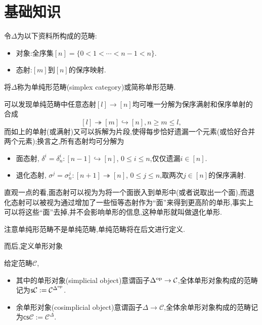 \section{基础知识}
\begin{definition}[单纯形范畴]
    令$\Delta$为以下资料所构成的范畴:
    \begin{itemize}
        \item 对象:全序集$[n]=\{0<1<\cdots<n-1<n\}$.
        \item 态射:$[m]$到$[n]$的保序映射.
    \end{itemize}
    将$\Delta$称为单纯形范畴(simplex category)或简称单形范畴.
\end{definition}
\begin{remark}\label{Rk:单纯范畴分解}
    可以发现单纯范畴中任意态射$[l]\to [n]$均可唯一分解为保序满射和保序单射的合成
    \[[l]\twoheadrightarrow [m]\hookrightarrow [n], n\geq m \leq l,\]
    而如上的单射(或满射)又可以拆解为片段,使得每步恰好遗漏一个元素(或恰好合并两个元素);换言之,所有态射均可分解为
    \begin{itemize}
        \item 面态射, $\delta^i=\delta_n^i:[n-1]\hookrightarrow [n]$, $0\leq i \leq n$,仅仅遗漏$i\in[n]$.
        \item 退化态射, $\sigma^j = \sigma_n^j: [n+1] \twoheadrightarrow [n]$, $0\leq j \leq n$,取两次$j\in[n]$的保序满射.
    \end{itemize}
    直观一点的看,面态射可以视为为将一个面嵌入到单形中(或者说取出一个面),而退化态射可以被视为通过增加了一些恒等态射作为``面''来得到更高阶的单形,事实上可以将这些``面''去掉,并不会影响单形的信息,这种单形就叫做退化单形.
\end{remark}
\begin{warning}
    注意单纯形范畴不是单纯范畴,单纯范畴将在后文进行定义.
\end{warning}
而后,定义单形对象
\begin{definition}[单形对象]\label{Def:单形对象}
    给定范畴$\mathcal{C}$,
    \begin{itemize}
        \item 其中的单形对象(simplicial object)意谓函子$\Delta^{\operatorname{op}} \to \mathcal{C}$,全体单形对象构成的范畴记为$\mathsf{s}\mathcal{C}:= \mathcal{C}^{\Delta^{\operatorname{op}}}$.
        \item 余单形对象(cosimplicial object)意谓函子$\Delta \to \mathcal{C}$,全体余单形对象构成的范畴记为$\mathsf{cs}\mathcal{C}:= \mathcal{C}^{\Delta}$.
    \end{itemize}
\end{definition}
